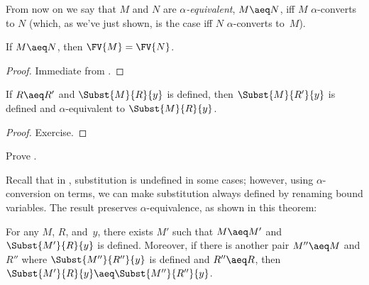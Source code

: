 \documentclass[../../../include/open-logic-section]{subfiles}
\begin{document}
From now on we say that $M$ and $N$ are \emph{$\alpha$-equivalent}, $M
\aeq N$, iff $M$ $\alpha$-converts to $N$ (which, as we've just shown,
is the case iff $N$ $\alpha$-converts to~$M$).

\begin{thm}
  If $M \aeq N$, then $\FV{M} = \FV{N}$.
\end{thm}

\begin{proof}
  Immediate from .
\end{proof}

\begin{lem}
  If $R \aeq R'$ and $\Subst{M}{R}{y}$ is defined, then $\Subst{M}{R'}{y}$ is
  defined and $\alpha$-equivalent to $\Subst{M}{R}{y}$.
\end{lem}

\begin{proof}
  Exercise.
\end{proof}

\begin{prob}
  Prove .
\end{prob}

Recall that in , substitution is undefined in some
cases; however, using $\alpha$-conversion on terms, we can make
substitution always defined by renaming bound variables. The result
preserves $\alpha$-equivalence, as shown in this theorem:

\begin{thm}
  For any $M$, $R$, and~$y$, there exists $M'$ such that $M \aeq M'$
  and $\Subst{M'}{R}{y}$ is defined. Moreover, if there is another
  pair $M'' \aeq M$ and $R''$ where $\Subst{M''}{R''}{y}$ is defined
  and $R'' \aeq R$, then $\Subst{M'}{R}{y} \aeq \Subst{M''}{R''}{y}$.
\end{thm}
\end{document}
